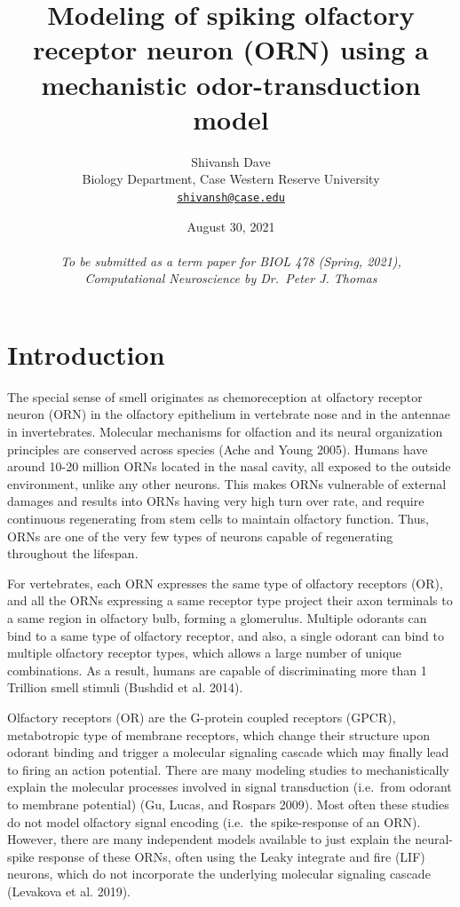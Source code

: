 \documentclass[
]{article}
\title{Modeling of spiking olfactory receptor neuron (ORN) using a mechanistic odor-transduction model}
\author{Shivansh Dave\\
Biology Department, Case Western Reserve University\\
\href{mailto:shivansh@case.edu}{\nolinkurl{shivansh@case.edu}}}
\date{August 30, 2021\\
~\\
\emph{To be submitted as a term paper for BIOL 478 (Spring, 2021),}\\
\emph{Computational Neuroscience by Dr.~Peter J. Thomas}}
\begin{document}
\maketitle

{
\setcounter{tocdepth}{2}
\tableofcontents
}
\newpage
{}

\hypertarget{introduction}{%
\section{Introduction}\label{introduction}}

The special sense of smell originates as chemoreception at olfactory receptor neuron (ORN) in the olfactory epithelium in vertebrate nose and in the antennae in invertebrates. Molecular mechanisms for olfaction and its neural organization principles are conserved across species (Ache and Young 2005). Humans have around 10-20 million ORNs located in the nasal cavity, all exposed to the outside environment, unlike any other neurons. This makes ORNs vulnerable of external damages and results into ORNs having very high turn over rate, and require continuous regenerating from stem cells to maintain olfactory function. Thus, ORNs are one of the very few types of neurons capable of regenerating throughout the lifespan.

For vertebrates, each ORN expresses the same type of olfactory receptors (OR), and all the ORNs expressing a same receptor type project their axon terminals to a same region in olfactory bulb, forming a glomerulus. Multiple odorants can bind to a same type of olfactory receptor, and also, a single odorant can bind to multiple olfactory receptor types, which allows a large number of unique combinations. As a result, humans are capable of discriminating more than 1 Trillion smell stimuli (Bushdid et al. 2014).

Olfactory receptors (OR) are the G-protein coupled receptors (GPCR), metabotropic type of membrane receptors, which change their structure upon odorant binding and trigger a molecular signaling cascade which may finally lead to firing an action potential. There are many modeling studies to mechanistically explain the molecular processes involved in signal transduction (i.e.~from odorant to membrane potential) (Gu, Lucas, and Rospars 2009). Most often these studies do not model olfactory signal encoding (i.e.~the spike-response of an ORN). However, there are many independent models available to just explain the neural-spike response of these ORNs, often using the Leaky integrate and fire (LIF) neurons, which do not incorporate the underlying molecular signaling cascade (Levakova et al. 2019).
\end{document}
